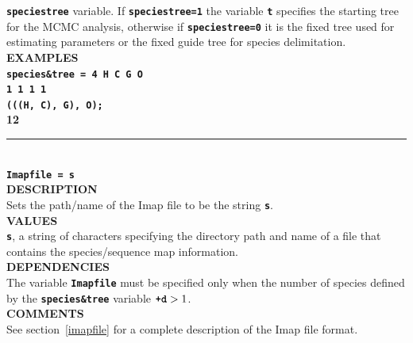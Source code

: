 \documentclass[a4paper]{book}
\numberwithin{equation}{section} \renewcommand{\baselinestretch}{0.55}
\begin{document}
\textbf{\texttt{speciestree}} variable. If
\textbf{\texttt{speciestree=1}} the variable \textbf{\texttt{t}}
specifies the starting tree for the MCMC analysis, otherwise if
\textbf{\texttt{speciestree=0}} it is the fixed tree used for
estimating parameters or the fixed guide tree for species
delimitation.
\vspace{5pt}\\
\textbf{EXAMPLES} \vspace{5pt}\\
\textbf{\texttt{species\&tree = 4  H  C  G  O}} \vspace{2pt}\\
\hspace*{7.2pc}  \textbf{\texttt{1  1  1  1}} \vspace{2pt}\\
\hspace*{7.2pc}  \textbf{\texttt{(((H, C), G), O);}} \vspace{10pt}\\
\textbf{{\large 12}} \\
\noindent\rule{\textwidth}{0.8pt} \\
\textbf{{\Large \texttt{Imapfile = s}}} \vspace{5pt}\\
\textbf{DESCRIPTION} \vspace{5pt}\\
Sets the path/name of the Imap file to be the string \textbf{\texttt{s}}. \vspace{5pt}\\
\textbf{VALUES} \vspace{5pt}\\
\textbf{\texttt{s}}, a string of characters specifying the directory path and name of a file that contains the species/sequence map information. \vspace{5pt}\\
\textbf{DEPENDENCIES} \vspace{5pt}\\
The variable \textbf{\texttt{Imapfile}} must be specified only when the number of species defined by the \textbf{\texttt{species\&tree}} variable $\textbf{\texttt{+d}} > 1$. \vspace{5pt}\\
\textbf{COMMENTS} \vspace{5pt}\\
See section~\ref{imapfile} for a complete description of the Imap file format. \vspace{5pt} \\
\end{document}
